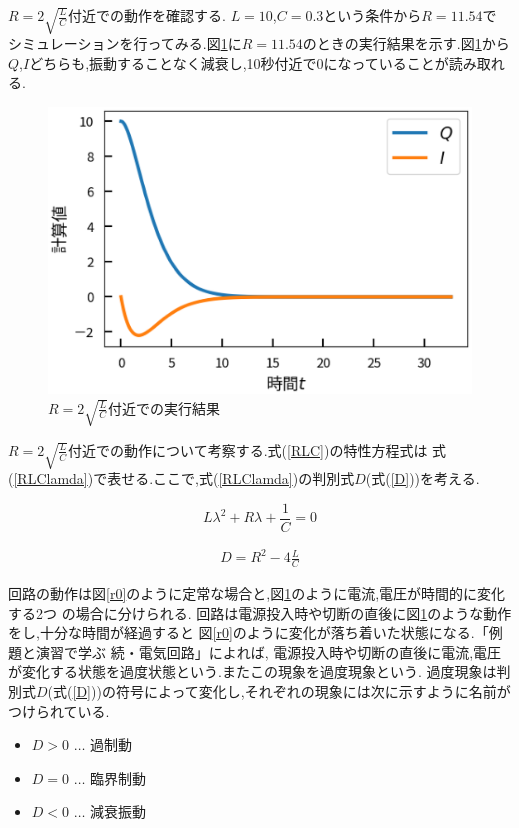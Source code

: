 \documentclass[a4j]{jarticle}
\begin{document}
        $R=2\sqrt{\frac{L}{C}}$付近での動作を確認する. $L=10$,$C=0.3$という条件から$R=11.54$で
        シミュレーションを行ってみる.図\ref{kado}に$R=11.54$のときの実行結果を示す.図\ref{kado}から
        $Q$,$I$どちらも,振動することなく減衰し,10秒付近で0になっていることが読み取れる.

        \begin{figure}[H]
          \centering
          \includegraphics[scale=0.6]{kado.eps}
          \caption{$R=2\sqrt{\frac{L}{C}}$付近での実行結果}
          \label{kado}
          \end{figure}

        $R=2\sqrt{\frac{L}{C}}$付近での動作について考察する.式(\ref{RLC})の特性方程式は
        式(\ref{RLClamda})で表せる.ここで,式(\ref{RLClamda})の判別式$D$(式(\ref{D}))を考える.

        \begin{equation}
          L \lambda^2 +R \lambda + \frac{1}{C}=0
          \label{RLClamda}
        \end{equation}

        \begin{eqnarray}
          D = R^2 -4\frac{L}{C} \label{D} 
        \end{eqnarray}

        回路の動作は図\ref{r0}のように定常な場合と,図\ref{kado}のように電流,電圧が時間的に変化する2つ
        の場合に分けられる. 回路は電源投入時や切断の直後に図\ref{kado}のような動作をし,十分な時間が経過すると
        図\ref{r0}のように変化が落ち着いた状態になる.「例題と演習で学ぶ 続・電気回路」\cite{cu}によれば,
        電源投入時や切断の直後に電流,電圧が変化する状態を過度状態という.またこの現象を過度現象という.
        過度現象は判別式$D$(式(\ref{D}))の符号によって変化し,それぞれの現象には次に示すように名前がつけられている.
        \begin{itemize}
          \item $D>0$ $\dots$ 過制動
          \item $D=0$ $\dots$ 臨界制動
          \item $D<0$ $\dots$ 減衰振動
        \end{itemize}
\end{document}
